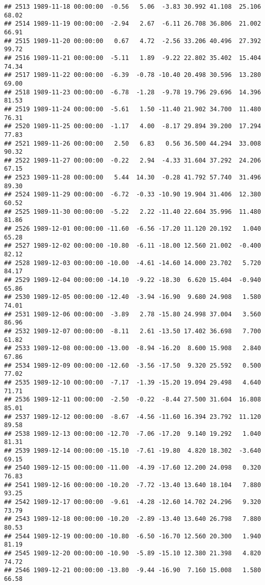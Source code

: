 \documentclass{article}\usepackage{graphicx, color}
\makeatletter
\newenvironment{kframe}{%
 \def\at@end@of@kframe{}%
 \ifinner\ifhmode%
  \def\at@end@of@kframe{\end{minipage}}%
  \begin{minipage}{\columnwidth}%
 \fi\fi%
 \def\FrameCommand##1{\hskip\@totalleftmargin \hskip-\fboxsep
 \colorbox{shadecolor}{##1}\hskip-\fboxsep
     \hskip-\linewidth \hskip-\@totalleftmargin \hskip\columnwidth}%
 \MakeFramed {\advance\hsize-\width
   \@totalleftmargin\z@ \linewidth\hsize
   \@setminipage}}%
 {\par\unskip\endMakeFramed%
 \at@end@of@kframe}
\newenvironment{knitrout}{}{} %
\makeatother
\begin{document}
\begin{knitrout}
\begin{kframe}
\begin{verbatim}
## 2513 1989-11-18 00:00:00  -0.56   5.06  -3.83 30.992 41.108  25.106  68.02
## 2514 1989-11-19 00:00:00  -2.94   2.67  -6.11 26.708 36.806  21.002  66.91
## 2515 1989-11-20 00:00:00   0.67   4.72  -2.56 33.206 40.496  27.392  99.72
## 2516 1989-11-21 00:00:00  -5.11   1.89  -9.22 22.802 35.402  15.404  74.34
## 2517 1989-11-22 00:00:00  -6.39  -0.78 -10.40 20.498 30.596  13.280  69.00
## 2518 1989-11-23 00:00:00  -6.78  -1.28  -9.78 19.796 29.696  14.396  81.53
## 2519 1989-11-24 00:00:00  -5.61   1.50 -11.40 21.902 34.700  11.480  76.31
## 2520 1989-11-25 00:00:00  -1.17   4.00  -8.17 29.894 39.200  17.294  77.83
## 2521 1989-11-26 00:00:00   2.50   6.83   0.56 36.500 44.294  33.008  90.32
## 2522 1989-11-27 00:00:00  -0.22   2.94  -4.33 31.604 37.292  24.206  67.15
## 2523 1989-11-28 00:00:00   5.44  14.30  -0.28 41.792 57.740  31.496  89.30
## 2524 1989-11-29 00:00:00  -6.72  -0.33 -10.90 19.904 31.406  12.380  60.52
## 2525 1989-11-30 00:00:00  -5.22   2.22 -11.40 22.604 35.996  11.480  81.86
## 2526 1989-12-01 00:00:00 -11.60  -6.56 -17.20 11.120 20.192   1.040  65.28
## 2527 1989-12-02 00:00:00 -10.80  -6.11 -18.00 12.560 21.002  -0.400  82.12
## 2528 1989-12-03 00:00:00 -10.00  -4.61 -14.60 14.000 23.702   5.720  84.17
## 2529 1989-12-04 00:00:00 -14.10  -9.22 -18.30  6.620 15.404  -0.940  65.86
## 2530 1989-12-05 00:00:00 -12.40  -3.94 -16.90  9.680 24.908   1.580  74.01
## 2531 1989-12-06 00:00:00  -3.89   2.78 -15.80 24.998 37.004   3.560  86.96
## 2532 1989-12-07 00:00:00  -8.11   2.61 -13.50 17.402 36.698   7.700  61.82
## 2533 1989-12-08 00:00:00 -13.00  -8.94 -16.20  8.600 15.908   2.840  67.86
## 2534 1989-12-09 00:00:00 -12.60  -3.56 -17.50  9.320 25.592   0.500  77.02
## 2535 1989-12-10 00:00:00  -7.17  -1.39 -15.20 19.094 29.498   4.640  71.71
## 2536 1989-12-11 00:00:00  -2.50  -0.22  -8.44 27.500 31.604  16.808  85.01
## 2537 1989-12-12 00:00:00  -8.67  -4.56 -11.60 16.394 23.792  11.120  89.58
## 2538 1989-12-13 00:00:00 -12.70  -7.06 -17.20  9.140 19.292   1.040  81.31
## 2539 1989-12-14 00:00:00 -15.10  -7.61 -19.80  4.820 18.302  -3.640  69.15
## 2540 1989-12-15 00:00:00 -11.00  -4.39 -17.60 12.200 24.098   0.320  76.83
## 2541 1989-12-16 00:00:00 -10.20  -7.72 -13.40 13.640 18.104   7.880  93.25
## 2542 1989-12-17 00:00:00  -9.61  -4.28 -12.60 14.702 24.296   9.320  73.79
## 2543 1989-12-18 00:00:00 -10.20  -2.89 -13.40 13.640 26.798   7.880  80.53
## 2544 1989-12-19 00:00:00 -10.80  -6.50 -16.70 12.560 20.300   1.940  81.19
## 2545 1989-12-20 00:00:00 -10.90  -5.89 -15.10 12.380 21.398   4.820  74.72
## 2546 1989-12-21 00:00:00 -13.80  -9.44 -16.90  7.160 15.008   1.580  66.58

\end{verbatim}
\end{kframe}
\end{knitrout}
\end{document}

